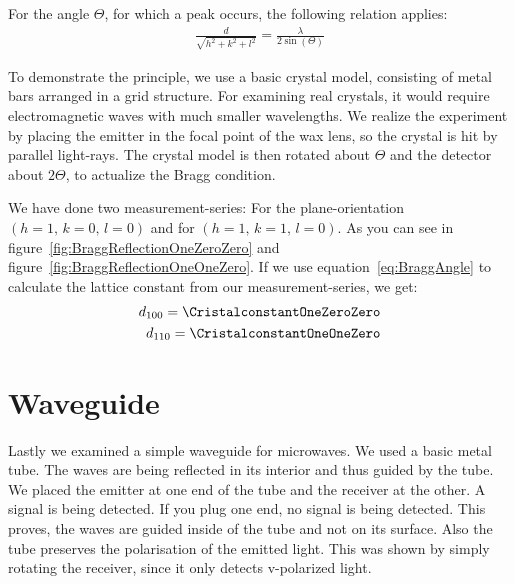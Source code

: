 \documentclass[a4paper,10pt,twocolumn]{article}
\begin{document}

    For the angle $\Theta$, for which a peak occurs, the following relation applies:
    \begin{align}
        \label{eq:BraggAngle}
        \frac{d}{\sqrt{h^2+k^2+l^2}} = \frac{\lambda}{2 \sin(\Theta)}
    \end{align}
    
    To demonstrate the principle, we use a basic crystal model, consisting of metal bars arranged in a grid structure.
    For examining real crystals, it would require electromagnetic waves with much smaller wavelengths.
    We realize the experiment by placing the emitter in the focal point of the wax lens, so the crystal is hit by
    parallel light-rays.
    The crystal model is then rotated about $\Theta$ and the detector about $2\Theta$, to actualize the Bragg condition.
    
    We have done two measurement-series: For the plane-orientation $(h=1,\,k=0,\,l=0)$ and for $(h=1,\,k=1,\,l=0)$.
    As you can see in figure~\ref{fig:BraggReflectionOneZeroZero} and figure~\ref{fig:BraggReflectionOneOneZero}.
    If we use equation~\eqref{eq:BraggAngle} to calculate the lattice constant from our measurement-series, we get:
    \begin{align*}
        d_{100} = \CristalconstantOneZeroZero \\
        d_{110} = \CristalconstantOneOneZero
    \end{align*}
    
    \section{Waveguide}
    
    Lastly we examined a simple waveguide for microwaves.
    We used a basic metal tube.
    The waves are being reflected in its interior and thus guided by the tube.
    We placed the emitter at one end of the tube and the receiver at the other.
    A signal is being detected.
    If you plug one end, no signal is being detected.
    This proves, the waves are guided inside of the tube and not on its surface.
    Also the tube preserves the polarisation of the emitted light.
    This was shown by simply rotating the receiver, since it only detects v-polarized light.
\end{document}
